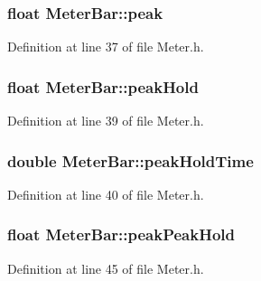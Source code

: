 \subsubsection[{\texorpdfstring{peak}{peak}}]{\setlength{\rightskip}{0pt plus 5cm}float Meter\+Bar\+::peak}\hypertarget{struct_meter_bar_a4b4aafca88830dbc403688711e780de9}{}\label{struct_meter_bar_a4b4aafca88830dbc403688711e780de9}


Definition at line 37 of file Meter.\+h.

\subsubsection[{\texorpdfstring{peak\+Hold}{peakHold}}]{\setlength{\rightskip}{0pt plus 5cm}float Meter\+Bar\+::peak\+Hold}\hypertarget{struct_meter_bar_af2ef854ab333ad2fd57402b0bc748d37}{}\label{struct_meter_bar_af2ef854ab333ad2fd57402b0bc748d37}


Definition at line 39 of file Meter.\+h.

\subsubsection[{\texorpdfstring{peak\+Hold\+Time}{peakHoldTime}}]{\setlength{\rightskip}{0pt plus 5cm}double Meter\+Bar\+::peak\+Hold\+Time}\hypertarget{struct_meter_bar_ad725e2ab4a80593e0de3d59300256f1b}{}\label{struct_meter_bar_ad725e2ab4a80593e0de3d59300256f1b}


Definition at line 40 of file Meter.\+h.

\subsubsection[{\texorpdfstring{peak\+Peak\+Hold}{peakPeakHold}}]{\setlength{\rightskip}{0pt plus 5cm}float Meter\+Bar\+::peak\+Peak\+Hold}\hypertarget{struct_meter_bar_a41b9908cda24b5d06b72fbae569c9904}{}\label{struct_meter_bar_a41b9908cda24b5d06b72fbae569c9904}


Definition at line 45 of file Meter.\+h.

